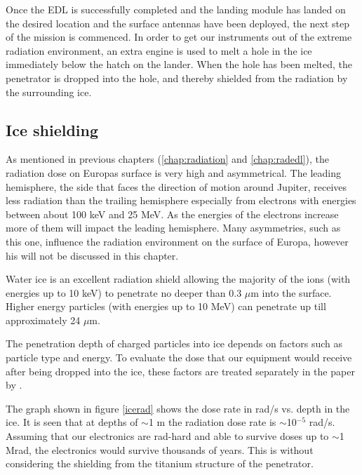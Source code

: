
Once the EDL is successfully completed and the landing module has landed on the desired location and the surface antennas have been deployed, the next step of the mission is commenced. In order to get our instruments out of the extreme radiation environment, an extra engine is used to melt a hole in the ice immediately below the hatch on the lander. When the hole has been melted, the penetrator is dropped into the hole, and thereby shielded from the radiation by the surrounding ice. 

\subsection{Ice shielding}

As mentioned in previous chapters (\ref{chap:radiation} and \ref{chap:radedl}), the radiation dose on Europas surface is very high and asymmetrical. The leading hemisphere, the side that faces the direction of motion around Jupiter, receives less radiation than the trailing hemisphere especially from electrons with energies between about 100 keV and
25 MeV. As the energies of the electrons increase more of them will impact the leading hemisphere. Many asymmetries, such as this one, influence the radiation environment on the surface of Europa, however his will not be discussed in this chapter. 


Water ice is an excellent radiation shield allowing the majority of the ions (with energies up to 10 keV) to penetrate no deeper than 0.3 $\mu$m into the surface. Higher energy particles (with energies up to 10 MeV) can penetrate up till approximately 24 $\mu$m. \cite{Paranicas_2009}

The penetration depth of charged particles into ice depends on factors such as particle type and energy. To evaluate the dose that our equipment would receive after being dropped into the ice, these factors are treated separately in the paper by \cite{Paranicas_2009}.

The graph shown in figure \ref{icerad} shows the dose rate in rad/s vs. depth in the ice. 
It is seen that at depths of $\sim$1 m the radiation dose rate is $\sim$10$^{-5}$ rad/s. Assuming that our electronics are rad-hard and able to survive doses up to $\sim$1 Mrad, the electronics would survive thousands of years. This is without considering the shielding from the titanium structure of the penetrator. 

